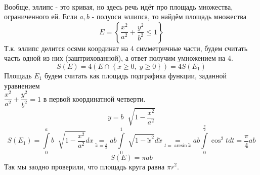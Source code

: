 \documentclass[../main.tex]{subfiles}
\begin{document}
\begin{example}

    ~

    Вообще, эллипс - это кривая, но здесь речь идёт про площадь множества, ограниченного ей. Если \( a, b\) - полуоси эллипса, то найдём площадь множества 
    \[ E = \left\{ \dfrac{ x^2}{ a^2}+ \dfrac{ y^2}{ b^2} \leq 1\right\}\]
    Т.к. эллипс делится осями координат на 4 симметричные части, будем считать часть одной из них (заштрихованной), а ответ получим умножением на 4. 
    \[ S\left( E\right)=4\left( E \cap \left\{ x \geq 0, \;y \geq 0\right\}\right) = 4S(E_1)\]
    Площадь \(E_1\) будем считать как площадь подграфика функции, заданной уравнением \\
    \( \dfrac{ x^2}{ a^2}+ \dfrac{ y^2}{ b^2}=1\) в первой координатной четверти. 
    \[ y= b\;\sqrt[]{1- \dfrac{ x^2}{ a^2}}\]
    \[ S\left( E_1\right)= \displaystyle\int\limits_{ 0}^{ a} b \;\sqrt[]{1- \dfrac{ x^2}{ a^2}}dx \underset{\tilde{x}= \frac{ x}{ a}}{=} ab\displaystyle\int\limits_{ 0}^{ 1} \sqrt[]{1- \tilde{x}^2}d \tilde{x} \underset{ 
        t=\arcsin{ \tilde{x}}}{=} ab\displaystyle\int\limits_{ 0}^{ \frac{ \pi}{ 2}} \cos^2tdt= \dfrac{ \pi}{ 4}ab\]
    \[ \boxed{S\left( E\right)= \pi ab}\]
    Так мы заодно проверили, что площадь круга равна \( \pi r^2\).
\end{example}
\end{document}
